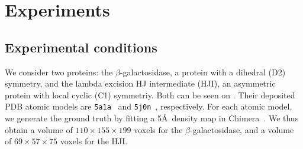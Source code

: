 \section{Experiments}

\subsection{Experimental conditions}\label{sec:results:data}

 We consider two proteins: the $\beta$-galactosidase, a protein with a dihedral (D2) symmetry, and the lambda excision HJ intermediate (HJI), an asymmetric protein with local cyclic (C1) symmetriy. Both can be seen on .
Their deposited PDB atomic models are \texttt{5a1a}~\cite{bartesaghi2015betagal} and \texttt{5j0n}~\cite{laxmikanthan2016structure}, respectively.
For each atomic model, we generate the ground truth by fitting a 5\AA\ density map in Chimera~\cite{pettersen2004ucsf}.
We thus obtain a volume of $110 \times 155 \times 199$ voxels for the $\beta$-galactosidase, and a volume of $69 \times 57 \times 75$ voxels for the HJI.


